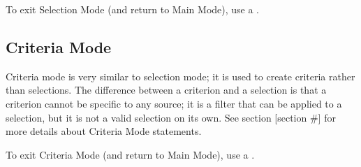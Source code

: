 To exit Selection Mode (and return to Main Mode), use a .

\subsection{Criteria Mode}
Criteria mode is very similar to selection mode; it is used to create criteria rather than selections. 
The difference between a criterion and a selection is that a criterion cannot be specific to any source; 
it is a filter that can be applied to a selection, but it is not a valid selection on its own. 
See section [section #] for more details about Criteria Mode statements.

To exit Criteria Mode (and return to Main Mode), use a .

